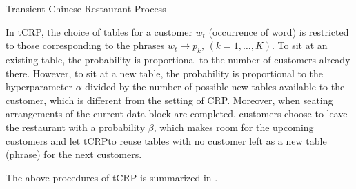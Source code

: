 \begin{algorithm}[h!]
\caption{Transient Chinese Restaurant Process}\label{alg::tcrp}
  \SetAlgoNoLine
\end{algorithm}

In tCRP, the choice of tables for a customer $w_t$ (occurrence of word) is
restricted to those corresponding to the phrases $w_t \rightarrow p_k,\, (k = 1,
\dots, K)$. To sit at an existing table, the probability is proportional to the
number of customers already there. However, to sit at a new table, the
probability is proportional to the hyperparameter $\alpha$ divided by the number
of possible new tables available to the customer, which is different from the
setting of CRP. Moreover, when seating arrangements of the current data block
are completed, customers choose to leave the restaurant with a probability
$\beta$, which makes room for the upcoming customers and let tCRPto reuse
tables with no customer left as a new table (phrase) for the next customers.

The above procedures of tCRP is summarized in .


